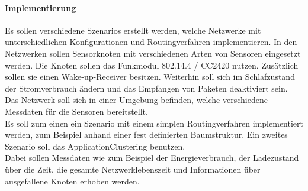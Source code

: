 \paragraph{Implementierung}
Es sollen verschiedene Szenarios erstellt werden, welche Netzwerke mit unterschiedlichen Konfigurationen und Routingverfahren implementieren. In den Netzwerken sollen Sensorknoten mit verschiedenen Arten von Sensoren eingesetzt werden. Die Knoten sollen das Funkmodul 802.14.4 / CC2420 nutzen. Zusätzlich sollen sie einen Wake-up-Receiver besitzen. Weiterhin soll sich im Schlafzustand der Stromverbrauch ändern und das Empfangen von Paketen deaktiviert sein. Das Netzwerk soll sich in einer Umgebung befinden, welche verschiedene Messdaten für die Sensoren bereitstellt.\\
Es soll zum einen ein Szenario mit einem simplen Routingverfahren implementiert werden, zum Beispiel anhand einer fest definierten Baumstruktur. Ein zweites Szenario soll das ApplicationClustering benutzen.\\
Dabei sollen Messdaten wie zum Beispiel der Energieverbrauch, der Ladezustand über die Zeit, die gesamte Netzwerklebenszeit und Informationen über ausgefallene Knoten erhoben werden.